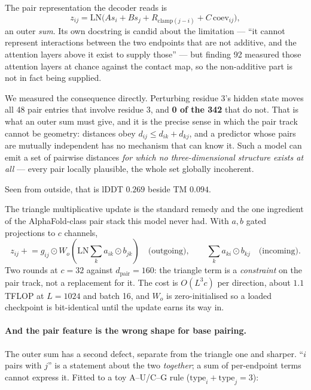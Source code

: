 \documentclass[11pt,a4paper]{article}
\begin{document}
The pair representation the decoder reads is
\begin{equation}
z_{ij} = \mathrm{LN}\!\big(A s_i + B s_j + R_{\mathrm{clamp}(j-i)}
         + C\,\mathrm{coev}_{ij}\big),
\end{equation}
an outer \emph{sum}. Its own docstring is candid about the limitation ---
``it cannot represent interactions between the two endpoints that are not
additive, and the attention layers above it exist to supply those'' ---
but finding 92 measured those attention layers at chance against the
contact map, so the non-additive part is not in fact being supplied.

We measured the consequence directly. Perturbing residue 3's hidden state
moves all 48 pair entries that involve residue 3, and \textbf{0 of the
342} that do not. That is what an outer sum must give, and it is the
precise sense in which the pair track cannot be geometry: distances obey
$d_{ij} \le d_{ik} + d_{kj}$, and a predictor whose pairs are mutually
independent has no mechanism that can know it. Such a model can emit a
set of pairwise distances \emph{for which no three-dimensional structure
exists at all} --- every pair locally plausible, the whole set globally
incoherent.

Seen from outside, that is lDDT $0.269$ beside TM $0.094$.

The triangle multiplicative update is the standard remedy and the one
ingredient of the AlphaFold-class pair stack this model never had. With
$a, b$ gated projections to $c$ channels,
\begin{equation}
z_{ij} \mathrel{+}= g_{ij} \odot W_o\!\left(
  \mathrm{LN}\sum_k a_{ik} \odot b_{jk}\right)
\quad\text{(outgoing)},\qquad
\sum_k a_{ki} \odot b_{kj} \quad\text{(incoming)} .
\end{equation}
Two rounds at $c = 32$ against $d_{\text{pair}} = 160$: the triangle term
is a \emph{constraint} on the pair track, not a replacement for it. The
cost is $O(L^3 c)$ per direction, about $1.1$\,TFLOP at $L = 1024$ and
batch 16, and $W_o$ is zero-initialised so a loaded checkpoint is
bit-identical until the update earns its way in.

\paragraph{And the pair feature is the wrong shape for base pairing.}
The outer sum has a second defect, separate from the triangle one and
sharper. ``$i$ pairs with $j$'' is a statement about the two
\emph{together}; a sum of per-endpoint terms cannot express it. Fitted to
a toy A--U/C--G rule ($\mathrm{type}_i + \mathrm{type}_j = 3$):
\end{document}
